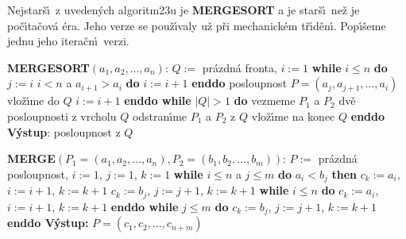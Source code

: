\flushpar Nejstar\v s\'\i\ z uveden\'ych algoritm\accent23u je 
{\bf MERGESORT} a je star\v s\'\i\ ne\v z je po\v c\'\i ta\v cov\'a \'era. Jeho 
verze se pou\v z\'\i valy u\v z p\v ri mecha\-nick\'em t\v r\'\i d\v en\'\i . Pop\'\i\v seme 
jednu jeho itera\v cn\'\i\ verzi. 
\bigskip

{\bf MERGESORT$\left(a_1,a_2,\dots,a_n\right)$}:\newline 
$Q:=$ pr\'azdn\'a fronta, $i:=1$\newline 
{\bf while} $i\le n$ {\bf do}\newline 
\phantom{---}$j:=i$\newline 
\phantom{---}{\bf while} $i<n$ a $a_{i+1}>a_i$ {\bf do} $i:=i+1$ {\bf enddo} \newline 
\phantom{---}posloupnost $P=\left(a_j,a_{j+1},\dots,a_i\right)$ vlo\v z\'\i me do $Q$\newline 
\phantom{---}$i:=i+1$\newline 
{\bf enddo\newline 
while} $|Q|>1$ {\bf do}\newline 
\phantom{---}vezmeme $P_1$ a $P_2$ dv\v e posloupnosti z vrcholu $Q$\newline 
\phantom{---}odstran\'\i me $P_1$ a $P_2$ z $Q$\newline 
\phantom{---}{\bf MERGE$\left(P_1,P_2\right)$} vlo\v z\'\i me na konec $Q$\newline 
{\bf enddo\newline 
V\'ystup}: posloupnost z $Q$
\bigskip

{\bf MERGE$\left(P_1=\left(a_1,a_2,\dots,a_n\right),P_2=\left(b_1,b_2,\dots,b_m\right)\right)$}:\newline 
$P:=$ pr\'azdn\'a posloupnost, $i:=1$, $j:=1$, $k:=1$\newline 
{\bf while} $i\le n$ a $j\le m$ {\bf do}\newline 
\phantom{---}{\bf if} $a_i<b_j$ {\bf then}\newline 
\phantom{------}$c_k:=a_i$, $i:=i+1$, $k:=k+1$\newline 
\phantom{---}{\bf else}\newline 
\phantom{------}$c_k:=b_j$, $j:=j+1$, $k:=k+1$\newline 
\phantom{---}{\bf endif\newline 
enddo}\newline 
{\bf while} $i\le n$ {\bf do}\newline 
\phantom{---}$c_k:=a_i$, $i:=i+1$, $k:=k+1$\newline 
{\bf enddo\newline 
while} $j\le m$ {\bf do}\newline 
\phantom{---}$c_k:=b_j$, $j:=j+1$, $k:=k+1$\newline 
{\bf enddo\newline 
V\'ystup:} $P=\left(c_1,c_2,\dots,c_{n+m}\right)$
\bigskip

